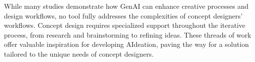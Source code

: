 
While many studies demonstrate how GenAI can enhance creative processes and design workflows, no tool fully addresses the complexities of concept designers' workflows. Concept design requires specialized support throughout the iterative process, from research and brainstorming to refining ideas. These threads of work offer valuable inspiration for developing AIdeation, paving the way for a solution tailored to the unique needs of concept designers.








 
